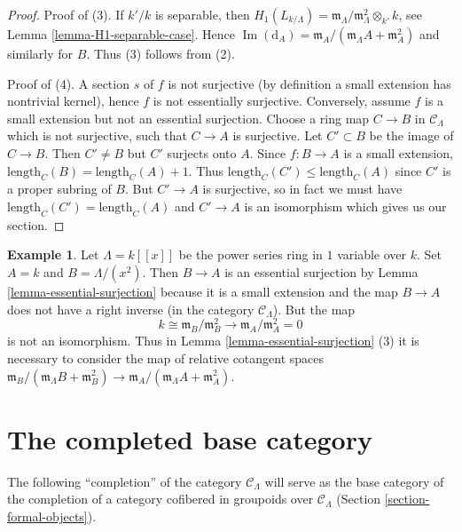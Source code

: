 \documentclass{stacks-project}
\theoremstyle{plain}
\theoremstyle{definition}
\newtheorem{example}[subsection]{Example}
\theoremstyle{remark}
\numberwithin{equation}{subsection}
\def\Im{\mathop{\mathrm{Im}}}
\begin{document}
\begin{proof}
\medskip\noindent
Proof of (3). If $k'/k$ is separable, then
$H_1(L_{k/\Lambda}) =
\mathfrak m_\Lambda/\mathfrak m_\Lambda^2 \otimes_{k'} k$, see
Lemma \ref{lemma-H1-separable-case}.
Hence $\Im(\text{d}_A) =
\mathfrak m_A/(\mathfrak m_\Lambda A + \mathfrak m_A^2)$
and similarly for $B$. Thus (3) follows from (2).

\medskip\noindent
Proof of (4). A section $s$ of $f$ is not surjective (by definition a
small extension has nontrivial kernel), hence $f$ is not essentially
surjective. Conversely, assume $f$ is a small extension but not an
essential surjection. Choose a ring map $C \to B$ in $\mathcal{C}_\Lambda$
which is not surjective, such that $C \to A$ is surjective. Let
$C' \subset B$ be the image of $C \to B$. Then $C' \not = B$ but
$C'$ surjects onto $A$. Since $f : B \to A$ is a small extension,
$\text{length}_C(B) = \text{length}_C(A) + 1$. Thus
$\text{length}_C(C') \leq \text{length}_C(A)$ since
$C'$ is a proper subring of $B$. But $C' \to A$ is surjective, so in
fact we must have $\text{length}_C(C') = \text{length}_C(A)$ and
$C' \to A$ is an isomorphism which gives us our section.
\end{proof}

\begin{example}
\label{example-essential-surjection}
Let $\Lambda = k[[x]]$ be the power series ring in $1$ variable over $k$.
Set $A = k$ and $B = \Lambda/(x^2)$. Then $B \to A$ is an essential
surjection by
Lemma \ref{lemma-essential-surjection}
because it is a small extension and the map $B \to A$ does not have a
right inverse (in the category $\mathcal{C}_\Lambda$). But the map
$$
k \cong \mathfrak m_B/\mathfrak m_B^2
\longrightarrow
\mathfrak m_A/\mathfrak m_A^2 = 0
$$
is not an isomorphism. Thus in
Lemma \ref{lemma-essential-surjection} (3)
it is necessary to consider the map of relative cotangent spaces
$\mathfrak m_B/(\mathfrak m_\Lambda B + \mathfrak m_B^2) \to
\mathfrak m_A/(\mathfrak m_\Lambda A + \mathfrak m_A^2)$.
\end{example}







\section{The completed base category}
\label{section-category-completion-CLambda}

\noindent
The following ``completion'' of the category $\mathcal{C}_\Lambda$ will serve
as the base category of the completion of a category cofibered in groupoids
over $\mathcal{C}_\Lambda$
(Section \ref{section-formal-objects}).
\end{document}
